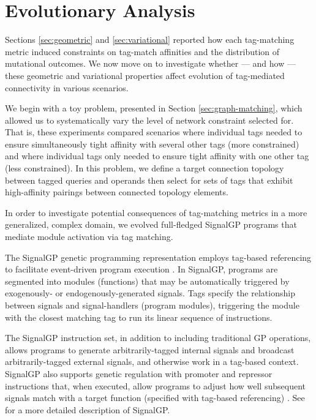 \section{Evolutionary Analysis} \label{sec:evolutionary}

Sections \ref{sec:geometric} and \ref{sec:variational} reported how each tag-matching metric induced constraints on tag-match affinities and the distribution of mutational outcomes.
We now move on to investigate whether --- and how ---  these geometric and variational properties affect evolution of tag-mediated connectivity in various scenarios.

We begin with a toy problem, presented in Section \ref{sec:graph-matching}, which allowed us to systematically vary the level of network constraint selected for.
That is, these experiments compared scenarios where individual tags needed to ensure simultaneously tight affinity with several other tags (more constrained) and where individual tags only needed to ensure tight affinity with one other tag (less constrained).
In this problem, we define a target connection topology between tagged queries and operands then select for sets of tags that exhibit high-affinity pairings between connected topology elements.

In order to investigate potential consequences of tag-matching metrics in a more generalized, complex domain, we evolved full-fledged SignalGP programs that mediate module activation via tag matching.

The SignalGP genetic programming representation employs tag-based referencing to facilitate event-driven program execution \citep{lalejini2018evolving}.
In SignalGP, programs are segmented into modules (functions) that may be automatically triggered by exogenously- or endogenously-generated signals.
Tags specify the relationship between signals and signal-handlers (program modules), triggering the module with the closest matching tag to run its linear sequence of instructions.

The SignalGP instruction set, in addition to including traditional GP operations, allows programs to generate arbitrarily-tagged internal signals and broadcast arbitrarily-tagged external signals, and otherwise work in a tag-based context.
SignalGP also supports genetic regulation with promoter and repressor instructions that, when executed, allow programs to adjust how well subsequent signals match with a target function (specified with tag-based referencing) \citep{lalejini2021tag}.
See \cite{lalejini2018evolving} for a more detailed description of SignalGP.

